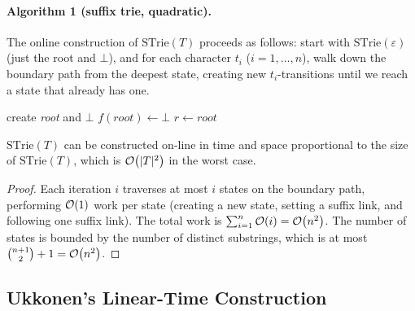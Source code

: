 \paragraph{Algorithm 1 (suffix trie, quadratic).}
The online construction of $\mathrm{STrie}(T)$ proceeds as follows:
start with $\mathrm{STrie}(\varepsilon)$ (just the root and $\bot$),
and for each character $t_i$ ($i = 1, \ldots, n$), walk down the
boundary path from the deepest state, creating new $t_i$-transitions
until we reach a state that already has one.

\begin{algorithm}[H]
  \caption{Online construction of $\mathrm{STrie}(T)$ (quadratic)}
  \label{alg:strie-quadratic}
  create \textit{root} and $\bot$\;
  $f(root) \gets \bot$\;
  $r \gets root$ 
\end{algorithm}

\begin{formaldetails}
\begin{theorem}
  \label{thm:strie-quadratic}
  $\mathrm{STrie}(T)$ can be constructed on-line in time and space
  proportional to the size of $\mathrm{STrie}(T)$, which is
  $\mathcal{O}\!\left(|T|^2\right)$ in the worst case.
\end{theorem}

\begin{proof}
  Each iteration $i$ traverses at most $i$ states on the boundary path,
  performing $\mathcal{O}\!\left(1\right)$ work per state (creating a new state, setting a
  suffix link, and following one suffix link).
  The total work is $\sum_{i=1}^{n} \mathcal{O}\!\left(i\right) = \mathcal{O}\!\left(n^2\right)$.
  The number of states is bounded by the number of distinct substrings,
  which is at most $\binom{n+1}{2} + 1 = \mathcal{O}\!\left(n^2\right)$.
\end{proof}
\end{formaldetails}

\subsection{Ukkonen's Linear-Time Construction}

